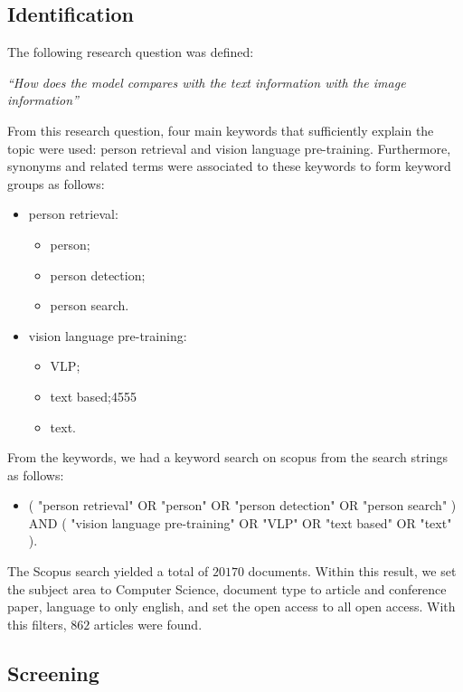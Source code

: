 \subsection*{Identification}

The following research question was defined:

\bigskip
\textit{``How does the model compares with the text information with the image information''}
\bigskip



From this research question, four main keywords that sufficiently explain the topic were used: person retrieval and vision language pre-training.
Furthermore, synonyms and related terms were associated to these keywords to form keyword groups as follows:

\begin{itemize}
    \item person retrieval:
    \begin{itemize}
        \item person;
        \item person detection;
        \item person search.
    \end{itemize}
    \item vision language pre-training:
    \begin{itemize}
        \item VLP;
        \item text based;4555
        \item text.
    \end{itemize}
\end{itemize}


From the keywords, we had a keyword search on scopus from the search strings as follows:

\begin{itemize}
    \item ( "person retrieval" OR "person" OR "person detection" OR "person search" ) AND ( "vision language pre-training" OR "VLP" OR "text based" OR "text" ).
\end{itemize}

The Scopus search yielded a total of $20170$ documents. Within this result, we set the subject area to Computer Science, document type to article and conference paper, language to only english, and set the open access to all open access. With this filters, $862$ articles were found. 

\subsection*{Screening}

